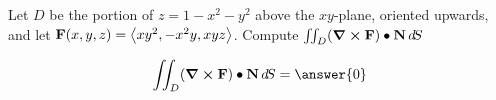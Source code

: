 \documentclass{ximera}
\author{David Guichard \and Neal Koblitz \and H. Jerome Keisler \and Albert Scheller \and Barry Balof \and Mike Wills \and Matthew Carr}
\begin{document}
\begin{exercise}




Let $D$ be the portion of $z=1-x^2-y^2$ above the $xy$-plane, oriented upwards, and let $\mathbf{F}(x,y,z)=\left\langle xy^2,-x^2y,xyz\right\rangle$. Compute $\iint_{D}(\boldsymbol\nabla\boldsymbol\times\mathbf{F})\bullet\mathbf{N}\mathop{}\!d\! S$

\begin{prompt}
\[
\iint_{D}(\curl\vec{F})\dotp\vec{N}\d S=\answer{0}
\]
\end{prompt}


\end{exercise}
\end{document}
